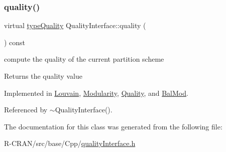 \subsubsection{\texorpdfstring{quality()}{quality()}}
{\footnotesize\ttfamily virtual \hyperlink{qualityInterface_8h_a15a3ec6041e6e02d00d2eff22c20fd94}{type\+Quality} Quality\+Interface\+::quality (\begin{DoxyParamCaption}{ }\end{DoxyParamCaption}) const\hspace{0.3cm}{\ttfamily [pure virtual]}}

compute the quality of the current partition scheme \begin{DoxyReturn}{Returns}
the quality value 
\end{DoxyReturn}


Implemented in \hyperlink{classLouvain_ae328a55f83e485adb14a501bfb704d75}{Louvain}, \hyperlink{classModularity_ab594c2c6ccde0e9467d7548923612c3a}{Modularity}, \hyperlink{classQuality_a9a6141e9247bc85177f9fe662ec4d14a}{Quality}, and \hyperlink{classBalMod_a5cfc9f2446c0734496440aa7fcfc2a9a}{Bal\+Mod}.



Referenced by $\sim$\+Quality\+Interface().



The documentation for this class was generated from the following file\+:\begin{DoxyCompactItemize}
\item 
R-\/\+C\+R\+A\+N/src/base/\+Cpp/\hyperlink{qualityInterface_8h}{quality\+Interface.\+h}\end{DoxyCompactItemize}
